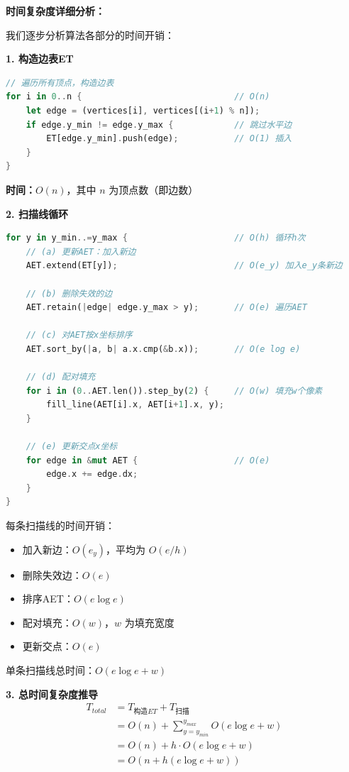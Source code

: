 ﻿\documentclass[12pt,a4paper]{article}
\begin{document}
\textbf{时间复杂度详细分析：}

我们逐步分析算法各部分的时间开销：

\textbf{1. 构造边表ET}
\begin{lstlisting}[language=Rust, numbers=none]
// 遍历所有顶点，构造边表
for i in 0..n {                              // O(n)
    let edge = (vertices[i], vertices[(i+1) % n]);
    if edge.y_min != edge.y_max {            // 跳过水平边
        ET[edge.y_min].push(edge);           // O(1) 插入
    }
}
\end{lstlisting}
\textbf{时间：}$O(n)$，其中 $n$ 为顶点数（即边数）

\textbf{2. 扫描线循环}
\begin{lstlisting}[language=Rust, numbers=none]
for y in y_min..=y_max {                     // O(h) 循环h次
    // (a) 更新AET：加入新边
    AET.extend(ET[y]);                       // O(e_y) 加入e_y条新边
    
    // (b) 删除失效的边
    AET.retain(|edge| edge.y_max > y);       // O(e) 遍历AET
    
    // (c) 对AET按x坐标排序
    AET.sort_by(|a, b| a.x.cmp(&b.x));       // O(e log e)
    
    // (d) 配对填充
    for i in (0..AET.len()).step_by(2) {     // O(w) 填充w个像素
        fill_line(AET[i].x, AET[i+1].x, y);
    }
    
    // (e) 更新交点x坐标
    for edge in &mut AET {                   // O(e)
        edge.x += edge.dx;
    }
}
\end{lstlisting}

每条扫描线的时间开销：
\begin{itemize}
\item 加入新边：$O(e_y)$，平均为 $O(e/h)$
\item 删除失效边：$O(e)$
\item 排序AET：$O(e \log e)$
\item 配对填充：$O(w)$，$w$ 为填充宽度
\item 更新交点：$O(e)$
\end{itemize}

单条扫描线总时间：$O(e \log e + w)$

\textbf{3. 总时间复杂度推导}
\begin{align}
T_{total} &= T_{构造ET} + T_{扫描} \\
&= O(n) + \sum_{y=y_{min}}^{y_{max}} O(e \log e + w) \\
&= O(n) + h \cdot O(e \log e + w) \\
&= O(n + h(e \log e + w))
\end{align}
\end{document}
